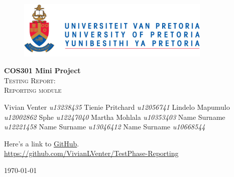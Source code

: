 \begin{titlepage}
	\begin{center}
		
		\begin{figure}[t]
			\centering
			\includegraphics[width=350px]{images/UP_Logo.png}
		\end{figure}
		
		\textbf{\Large COS301 Mini Project } \\
		\textsc{\Large Testing Report:  } \\
		\textsc{\Large Reporting module } \\
		
		\begin{flushright} \large
			Vivian Venter 		\emph{u13238435} \newline
			Tienie Pritchard 		\emph{u12056741} \newline
			Lindelo Mapumulo		\emph{u12002862} \newline
			Sphe 				\emph{u12247040} \newline
			Martha Mohlala 		\emph{u10353403} \newline
			Name Surname 		\emph{u12221458} \newline
			Name Surname 		\emph{u13046412} \newline
			Name Surname 		\emph{u10668544} \newline
		\end{flushright}
		
		\vfill
		
	Here's a link to \href{https://github.com/VivianLVenter/TestPhase-Reporting}{GitHub}.\\
	\url{https://github.com/VivianLVenter/TestPhase-Reporting}

	\vfill

	{\large \today}		
		
		
	\end{center}
\end{titlepage}
